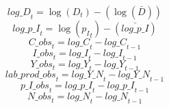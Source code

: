 \begin{dmath}
{log\_D}_{t}=\log\left({{D}}_{t}\right)-(\log\left(\bar{{D}}\right))
\end{dmath}
\begin{dmath}
{log\_p\_I}_{t}=\log\left({{p_I}}_{t}\right)-(\bar{log\_p\_I})
\end{dmath}
\begin{dmath}
{C\_obs}_{t}={log\_C}_{t}-{log\_C}_{t-1}
\end{dmath}
\begin{dmath}
{I\_obs}_{t}={log\_I}_{t}-{log\_I}_{t-1}
\end{dmath}
\begin{dmath}
{Y\_obs}_{t}={log\_Y}_{t}-{log\_Y}_{t-1}
\end{dmath}
\begin{dmath}
{lab\_prod\_obs}_{t}={log\_Y\_N}_{t}-{log\_Y\_N}_{t-1}
\end{dmath}
\begin{dmath}
{p\_I\_obs}_{t}={log\_p\_I}_{t}-{log\_p\_I}_{t-1}
\end{dmath}
\begin{dmath}
{N\_obs}_{t}={log\_N}_{t}-{log\_N}_{t-1}
\end{dmath}
